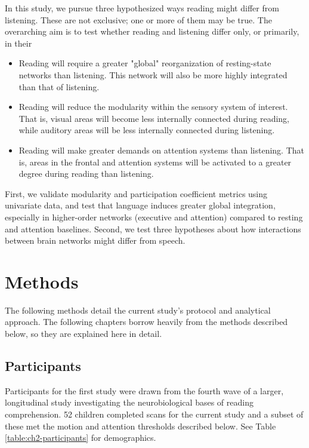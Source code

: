 In this study, we pursue three hypothesized ways reading might differ from listening. These are not exclusive; one or more of them may be true. The overarching aim is to test whether reading and listening differ only, or primarily, in their 

\begin{itemize}
	\item Reading will require a greater "global" reorganization of resting-state networks than listening. This network will also be more highly integrated than that of listening. 
	\item Reading will reduce the modularity within the sensory system of interest. That is, visual areas will become less internally connected during reading, while auditory areas will be less internally connected during listening.
	\item Reading will make greater demands on attention systems than listening. That is, areas in the frontal and attention systems will be activated to a greater degree during reading than listening.
\end{itemize}

First, we validate modularity and participation coefficient metrics using univariate data, and test that language induces greater global integration, especially in higher-order networks (executive and attention) compared to resting and attention baselines. Second, we test three hypotheses about how interactions between brain networks might differ from speech.


\section{Methods}

The following methods detail the current study's protocol and analytical approach. The following chapters borrow heavily from the methods described below, so they are explained here in detail. 

\subsection{Participants}

Participants for the first study were drawn from the fourth wave of a larger, longitudinal study investigating the neurobiological bases of reading comprehension. 52 children completed scans for the current study and a subset of these met the motion and attention thresholds described below. See Table \ref{table:ch2-participants} for demographics. 

